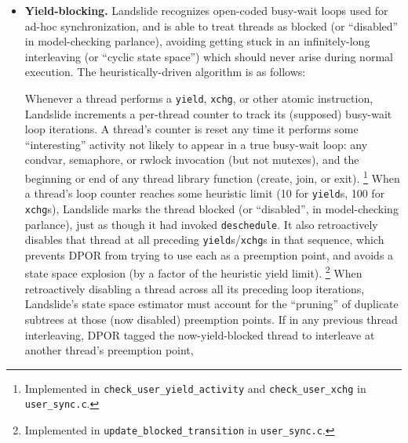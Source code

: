 \begin{itemize}
	\item {\bf Yield-blocking.}
		Landslide recognizes open-coded busy-wait loops used for ad-hoc synchronization,
		and is able to treat threads as blocked (or ``disabled'' in model-checking parlance),
		avoiding getting stuck in an infinitely-long interleaving (or ``cyclic state space'')
		which should never arise during normal execution.
		The heuristically-driven algorithm is as follows:
		\begin{itemize}
			\llitem Whenever a thread performs a {\tt yield}, {\tt xchg}, or other atomic instruction,
				Landslide increments a per-thread counter to track its (supposed) busy-wait loop iterations.
				A thread's counter is reset any time it performs some ``interesting'' activity not likely to appear in a true busy-wait loop:
				any condvar, semaphore, or rwlock invocation (but not mutexes),
				and the beginning or end of any thread library function (create, join, or exit).
				\footnote{Implemented in {\tt check\_user\_yield\_activity} and {\tt check\_user\_xchg} in {\tt user\_sync.c}.}
			\llitem When a thread's loop counter reaches some heuristic limit (10 for {\tt yield}s, 100 for {\tt xchg}s),
				Landslide marks the thread blocked (or ``disabled'', in model-checking parlance),
				just as though it had invoked {\tt deschedule}.
				It also retroactively disables that thread at all preceding {\tt yield}s/{\tt xchg}s in that sequence,
				which prevents DPOR from trying to use each as a preemption point,
				and avoids a state space explosion (by a factor of the heuristic yield limit).
				\footnote{Implemented in {\tt update\_blocked\_transition} in {\tt user\_sync.c}.}
			\llitem When retroactively disabling a thread across all its preceding loop iterations,
				Landslide's state space estimator must account for the ``pruning'' of duplicate subtrees at those (now disabled) preemption points.
				If in any previous thread interleaving, DPOR tagged the now-yield-blocked thread to interleave at another thread's preemption point,

\end{itemize}
\end{itemize}
